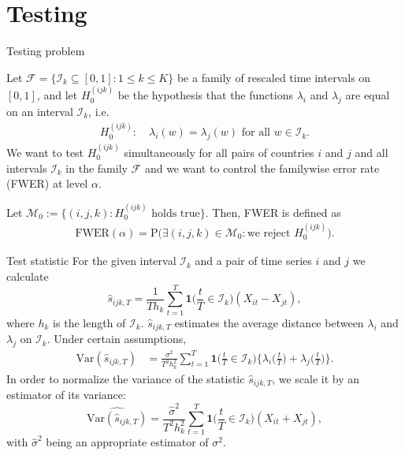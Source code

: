 \documentclass[10pt, handout]{beamer}
\newcommand{\Prob}{\mathrm{P}}
\newcommand{\Var}{\mathrm{Var}}
\newcommand{\ind}{\boldsymbol{1}\Big( \frac{t}{T} \in \mathcal{I}_k \Big)} %
\begin{document}
\section{Testing}
\begin{frame}{Testing problem}

Let $\mathcal{F} =\{ \mathcal{I}_k \subseteq [0, 1]: 1 \le k \le K\}$ be a family of rescaled time intervals on $[0, 1]$, and let $H_0^{(ijk)}$ be the hypothesis that the functions $\lambda_i$ and $\lambda_j$ are equal on an interval $\mathcal{I}_k$, i.e.
\begin{align*}
H_0^{(ijk)}:\quad  \lambda_i(w) = \lambda_j(w) \text{ for all } w\in \mathcal{I}_k.
\end{align*}\pause
We want to test $H_0^{(ijk)}$ simultaneously for all pairs of countries $i$ and $j$ and all intervals $\mathcal{I}_k$ in the family $\mathcal{F}$ and we want to control the familywise error rate (FWER) at level $\alpha$.\pause

Let $\mathcal{M}_0 := \big\{(i, j, k): H_0^{(ijk)} \text{ holds true}\big\}$. Then, FWER is defined as
\begin{align*}
\text{FWER}(\alpha) = \Prob \Big( \exists (i,j,k) \in \mathcal{M}_0: \text{we reject } H_0^{(ijk)} \Big).
\end{align*}
\end{frame} 


\begin{frame}[label = frame_teststatistic]{Test statistic}
For the given interval $\mathcal{I}_k$ and a pair of time series $i$ and $j$ we calculate
\begin{equation*}
\hat{s}_{ijk,T} = \frac{1}{T h_k} \sum\limits_{t=1}^T \ind (X_{it} -X_{jt}), 
\end{equation*}
where $h_k$ is the length of $\mathcal{I}_k$. \pause $\hat{s}_{ijk,T}$ estimates the average distance between $\lambda_i$ and $\lambda_j$ on $\mathcal{I}_k$. \pause Under certain assumptions, 
\begin{align*}
\Var(\hat{s}_{ijk,T})  & = \frac{\sigma^2}{T^2 h_k^2} \sum\limits_{t=1}^T \ind \Big\{ \lambda_i\Big(\frac{t}{T}\Big) + \lambda_j\Big(\frac{t}{T}\Big) \Big\}. 
\end{align*}\pause
In order to normalize the variance of the statistic $\hat{s}_{ijk,T}$, we scale it by an estimator of its variance:
\[ \widehat{\Var(\hat{s}_{ijk,T})} = \frac{\hat{\sigma}^2}{T^2 h_k^2} \sum\limits_{t=1}^T \ind (X_{it} + X_{jt} ), \]
with $\hat{\sigma}^2$ being an appropriate estimator of $\sigma^2$. \hyperlink{frame_sigma}{}
\end{frame}
\end{document}
